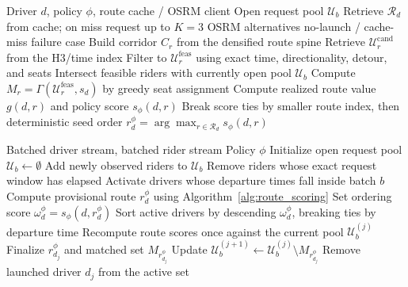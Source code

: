 \documentclass[journal]{IEEEtran}
\begin{document}
\begin{algorithm}[!t]
\caption{Route-aware retrieval and scoring for one driver}
\label{alg:route_scoring}
\footnotesize
\begin{algorithmic}[1]
\Require Driver \(d\), policy \(\phi\), route cache / OSRM client
\Statex \hspace{\algorithmicindent} Open request pool \(\mathcal{U}_b\)
\State Retrieve \(\mathcal{R}_d\) from cache; on miss request up to \(K=3\) OSRM alternatives
    \State \Return no-launch / cache-miss failure case
\EndIf
{}
    \State Build corridor \(C_r\) from the densified route spine
    \State Retrieve \(\mathcal{U}_r^{\mathrm{cand}}\) from the H3/time index
    \State Filter to \(\mathcal{U}_r^{\mathrm{feas}}\) using
    \Statex \hspace{\algorithmicindent} exact time, directionality, detour, and seats
    \State Intersect feasible riders with currently open pool \(\mathcal{U}_b\)
    \State Compute \(M_r=\Gamma(\mathcal{U}_r^{\mathrm{feas}},s_d)\) by greedy seat assignment
    \State Compute realized route value \(g(d,r)\) and policy score \(s_\phi(d,r)\)
\EndFor
\State Break score ties by smaller route index, then deterministic seed order
\State \Return \(r_d^\phi=\arg\max_{r \in \mathcal{R}_d}s_\phi(d,r)\)
\end{algorithmic}
\end{algorithm}

\begin{algorithm}[!t]
\caption{Rolling-horizon dispatch with one-step conflict recomputation}
\label{alg:dispatch}
\footnotesize
\begin{algorithmic}[1]
\Require Batched driver stream, batched rider stream
\Statex \hspace{\algorithmicindent} Policy \(\phi\)
\State Initialize open request pool \(\mathcal{U}_b \gets \emptyset\)
    \State Add newly observed riders to \(\mathcal{U}_b\)
    \State Remove riders whose exact request window has elapsed
    \State Activate drivers whose departure times fall inside batch \(b\)
        \State Compute provisional route \(r_d^\phi\) using Algorithm~\ref{alg:route_scoring}
        \State Set ordering score \(\omega_d^\phi=s_\phi(d,r_d^\phi)\)
    \EndFor
    \State Sort active drivers by descending \(\omega_d^\phi\), breaking ties by departure time
        \State Recompute route scores once against the current pool \(\mathcal{U}_b^{(j)}\)
        \State Finalize \(r_{d_j}^{\phi}\) and matched set \(M_{r_{d_j}^{\phi}}\)
        \State Update \(\mathcal{U}_b^{(j+1)} \gets \mathcal{U}_b^{(j)} \setminus M_{r_{d_j}^{\phi}}\)
        \State Remove launched driver \(d_j\) from the active set
    \EndFor
\EndFor
\end{algorithmic}
\end{algorithm}
\end{document}
